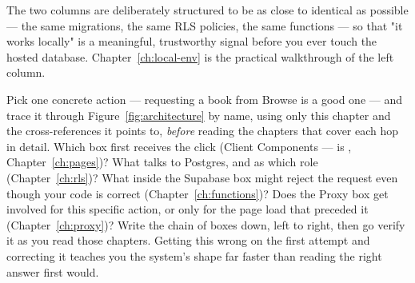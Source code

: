 The two columns are deliberately structured to be as close to identical as possible — the same migrations, the same RLS policies, the same functions — so that "it works locally" is a meaningful, trustworthy signal before you ever touch the hosted database. Chapter~\ref{ch:local-env} is the practical walkthrough of the left column.

\begin{olktask}
Pick one concrete action — requesting a book from Browse is a good one — and trace it through Figure~\ref{fig:architecture} by name, using only this chapter and the cross-references it points to, \emph{before} reading the chapters that cover each hop in detail. Which box first receives the click (Client Components —  is , Chapter~\ref{ch:pages})? What talks to Postgres, and as which role (Chapter~\ref{ch:rls})? What inside the Supabase box might reject the request even though your code is correct (Chapter~\ref{ch:functions})? Does the Proxy box get involved for this specific action, or only for the page load that preceded it (Chapter~\ref{ch:proxy})? Write the chain of boxes down, left to right, then go verify it as you read those chapters. Getting this wrong on the first attempt and correcting it teaches you the system's shape far faster than reading the right answer first would.
\end{olktask}
